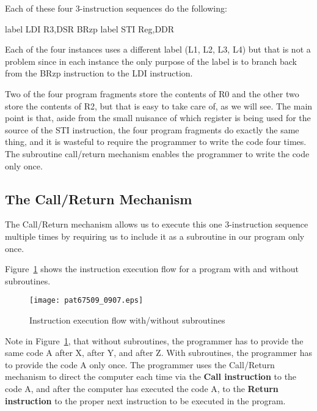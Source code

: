 \documentclass{patt}
\begin{document}
\FloatBarrier

Each of these four 3-instruction sequences do the following:

\begin{colorverbatim}
                    label   LDI   R3,DSR
                            BRzp  label
                            STI   Reg,DDR
\end{colorverbatim}


Each of the four instances uses a different label (L1, L2, L3, L4) but
that is not a problem since in each instance the only purpose of the label 
is to branch back from the BRzp instruction to the LDI instruction.

Two of the four program fragments store the contents of R0 and the
other two store the contents of R2, but that is easy to take care of,
as we will see.  The main point is that, aside from the small nuisance
of which register is being used for the source of the STI
instruction, the four program fragments do exactly the same thing, and
it is wasteful to require the programmer to write the code four times.
The subroutine call/return mechanism enables the programmer to write the
code only once.

\FloatBarrier
\subsection{The Call/Return Mechanism}

The Call/Return mechanism allows us to execute this one 3-instruction
sequence multiple times by requiring us to include it as a
subroutine in our program only once.

Figure~\ref{fig:subroutines} shows the instruction
execution flow for a program with and without subroutines.

\begin{figure}[h]
\centerline{\texttt{[image: pat67509\_0907.eps]}}
\caption{Instruction execution flow with/without subroutines}
\label{fig:subroutines}
\end{figure}

Note in Figure~\ref{fig:subroutines}, that without subroutines, 
the programmer has 
to provide the same code A after X, after Y, and after Z.  With subroutines,
the programmer has to provide the code A only once. The programmer uses the 
Call/Return mechanism to direct the computer each time via the 
{\bf Call instruction} to the 
code A, and after the computer has executed the code A, to the
{\bf Return instruction} to the 
proper next instruction to be executed in the program.
\end{document}

